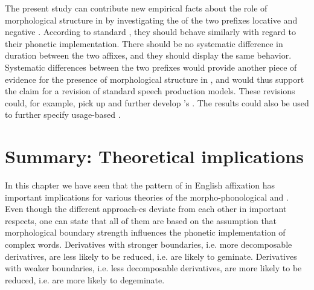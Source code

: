  

 
 
 The present study can contribute new empirical facts about the role of morphological structure in  by investigating the  of the two  prefixes locative and negative . According to standard , they should behave similarly with regard to their phonetic implementation. There should be no systematic difference in duration between the two affixes, and they should display the same  behavior. Systematic differences between the two prefixes would provide another piece of evidence for the presence of morphological structure in , and would thus support the claim for a revision of standard speech production models. These revisions could, for example, pick up and further develop \citeauthor{CohenGoldberg.2013}'s  . The results could also be used to further specify usage-based .



 
 




\section{Summary: Theoretical implications}\label{summary predictions}

 In this chapter we have seen that the pattern of  in English affixation has important implications for various theories of the morpho-phonological and . Even though the different approach-es deviate from each other in important respects, one can state that all of them are based on the assumption that morphological boundary strength influences the phonetic implementation of complex words. Derivatives with stronger boundaries, i.e. more decomposable derivatives, are less likely to be reduced, i.e. are likely to geminate. Derivatives with weaker boundaries, i.e. less decomposable derivatives, are more likely to be reduced, i.e. are more likely to degeminate. 
 

